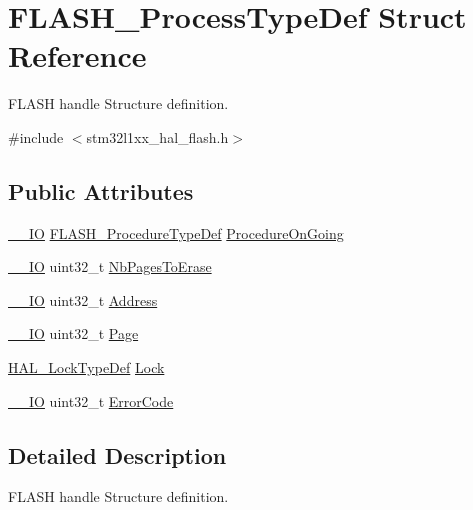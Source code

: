 \hypertarget{struct_f_l_a_s_h___process_type_def}{\section{F\-L\-A\-S\-H\-\_\-\-Process\-Type\-Def Struct Reference}
\label{struct_f_l_a_s_h___process_type_def}
}


F\-L\-A\-S\-H handle Structure definition.  




{\ttfamily \#include $<$stm32l1xx\-\_\-hal\-\_\-flash.\-h$>$}

\subsection*{Public Attributes}
\begin{DoxyCompactItemize}
\item 
\hyperlink{core__sc300_8h_aec43007d9998a0a0e01faede4133d6be}{\-\_\-\-\_\-\-I\-O} \hyperlink{group___f_l_a_s_h___exported___types_ga2b0268387bc11bcab76be9ce7c43eaaf}{F\-L\-A\-S\-H\-\_\-\-Procedure\-Type\-Def} \hyperlink{struct_f_l_a_s_h___process_type_def_adcc5fdaba7d53dffdab0510a4dd7d179}{Procedure\-On\-Going}
\item 
\hyperlink{core__sc300_8h_aec43007d9998a0a0e01faede4133d6be}{\-\_\-\-\_\-\-I\-O} uint32\-\_\-t \hyperlink{struct_f_l_a_s_h___process_type_def_a0f55783c6dde84a998593cce2e08280b}{Nb\-Pages\-To\-Erase}
\item 
\hyperlink{core__sc300_8h_aec43007d9998a0a0e01faede4133d6be}{\-\_\-\-\_\-\-I\-O} uint32\-\_\-t \hyperlink{struct_f_l_a_s_h___process_type_def_a680a9b907eb67c762b16ef7051cd8942}{Address}
\item 
\hyperlink{core__sc300_8h_aec43007d9998a0a0e01faede4133d6be}{\-\_\-\-\_\-\-I\-O} uint32\-\_\-t \hyperlink{struct_f_l_a_s_h___process_type_def_a36232ab2e05c69dc3a6804685a3b0e8c}{Page}
\item 
\hyperlink{stm32l1xx__hal__def_8h_ab367482e943333a1299294eadaad284b}{H\-A\-L\-\_\-\-Lock\-Type\-Def} \hyperlink{struct_f_l_a_s_h___process_type_def_ab5892cd1aacb0c0304b40f57023061e2}{Lock}
\item 
\hyperlink{core__sc300_8h_aec43007d9998a0a0e01faede4133d6be}{\-\_\-\-\_\-\-I\-O} uint32\-\_\-t \hyperlink{struct_f_l_a_s_h___process_type_def_a8a6cc581b8b180090429d0a3c0ca0172}{Error\-Code}
\end{DoxyCompactItemize}


\subsection{Detailed Description}
F\-L\-A\-S\-H handle Structure definition. 

